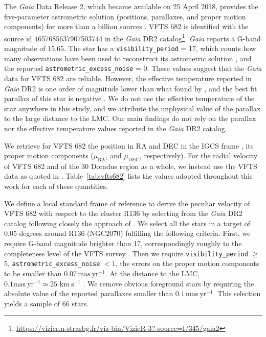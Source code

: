 \documentclass[apjl,twocolumn]{emulateapj}
\newcommand{\kms}{{\,\mathrm{km\ s^{-1}}}}
\DeclareRobustCommand{\Tabref}[1]{Table~\ref{#1}}
\begin{document}
The \emph{Gaia} Data Release 2, which became available on 25 April 2018,
provides the five-parameter astrometric solution (positions,
parallaxes, and proper motion components) for more than a billion
sources \citep{brown:18}. VFTS 682 is identified with the source id 4657685637907503744 in the \emph{Gaia} DR2
catalog\footnote{\url{https://vizier.u-strasbg.fr/viz-bin/VizieR-3?-source=I/345/gaia2}}. \emph{Gaia}
reports a G-band magnitude of 15.65. The star has a
\texttt{visibility\_period} = 17, which counts how many observations have
been used to reconstruct its astrometric solution
\citep[][]{lindengren:18}, and the reported
\texttt{astrometric\_excess\_noise} = 0. These values suggest that the \emph{Gaia}
data for VFTS 682 are reliable. However, the effective temperature
reported in \emph{Gaia} DR2 is one order of magnitude lower than what found by
\cite{bestenlehner:11}, and the best fit parallax of this star is
negative \citep[see, e.g.,][]{hogg:18}. We do not use the effective temperature of the star anywhere
in this study, and we attribute the unphysical value of the parallax
to the large distance to the LMC. Our main findings do not rely on the
parallax nor the effective temperature values reported in the \emph{Gaia} DR2
catalog.

We retrieve for VFTS 682 the position in RA and DEC
in the IGCS frame \cite[][]{brown:18}, its
proper motion components ($\mu_\mathrm{RA}$, and $\mu_\mathrm{DEC}$,
respectively). For the radial velocity of VFTS 682 and of the 30 Doradus
region as a whole, we instead use the VFTS data
as quoted in \cite{bestenlehner:11}. \Tabref{tab:vfts682} lists the values adopted throughout
this work for each of these quantities.


We define a local standard frame of reference to derive the peculiar velocity
of VFTS 682 with respect to the cluster R136 by selecting from the \emph{Gaia} DR2 catalog following closely the approach of \cite{vandermarel:02,lennon:18}.
We select all the stars in a target of 0.05 degrees around R136
(NGC2070) fulfilling the following criteria. First, we require G-band
magnitude brighter than 17, correspondingly roughly to the
completeness level of the VFTS survey \citep[here we implicitly assume
G$\sim$V,][]{evans:11}. Then we require \texttt{visibility\_period} $\geq$ 5,
\texttt{astrometric\_excess\_noise} $< 1$, the errors on the proper
motion components to be smaller than 0.07\,$\mathrm{mas\
  yr^{-1}}$. At the distance to the LMC, $0.1\mathrm{mas\
  yr^{-1}}\simeq25\,\kms$ \citep[e.g.,][]{platais:18}. We
remove obvious foreground stars by requiring the absolute value of
the reported parallaxes smaller than $0.1\,\mathrm{mas\ yr^{-1}}$.
This selection yields a sample of 66 stars.%
\end{document}
